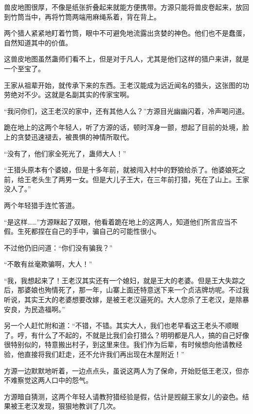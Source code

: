 
\begin{this_body}



兽皮地图很厚，不像是纸张折叠起来就能方便携带。方源只能将兽皮卷起来，放回到竹筒当中，再将竹筒两端用麻绳系着，背在背上。

两个猎人紧紧地盯着竹筒，眼中不可避免地流露出贪婪的神色。他们也不是蠢蛋，自然知道其中的价值。

这兽皮地图虽然蛊师们看不上，但是对于凡人，尤其是他们这样的猎户来讲，就是一个至宝了。

王家从祖辈开始，就传承下来的东西。王老汉能成为远近闻名的猎头，这张图的功劳绝对不少。这就是名副其实的传家宝啊。

“我问你们，这王老汉的家中，还有其他人么？”方源目光幽幽闪着，冷声喝问道。

跪在地上的这两个年轻人，听了方源的话，顿时浑身一颤，想起了目前的处境，脸上的贪婪迅速褪去，被畏惧的神情所取代。

“没有了，他们家全死光了，蛊师大人！”

“王猎头原本有个婆娘，但是十多年前，就被闯入村中的野狼给杀了。他婆娘死之前，给王老头生了两男一女。但是大儿子王大，在三年前打猎，死在了山上。王家没人了。”

两个年轻猎手连忙答道。

“是这样……”方源眯起了双眼，他看着跪在地上的这两人，知道他们所言应当不假。生死都捏在自己的手中，骗自己的可能性很小。

不过他仍旧问道：“你们没有骗我？”

“不敢有丝毫欺骗啊，大人！”

“我，我想起来了！王老汉其实还有一个媳妇，就是王大的老婆。但是王大失踪之后，那婆娘也殉情死了，那一年，山寨上面还特意送下来一个贞洁牌坊呢。不过我听说，其实王大的老婆想要改嫁，是被王老汉逼死的。大人您杀了王老汉，是除暴安良，为民造福啊。”

另一个人赶忙附和道：“不错，不错。其实大人，我们也老早看这王老头不顺眼了。哼，有什么了不起的，不就是比我们会打猎么？明明都是凡人，搞的自己好像很特别似的，特意搬出村子，到这里来住。我们作为后辈，有时候想向他请教经验，他直接将我们赶走，还不允许我们再出现在木屋附近！”

方源一边默默地听着，一边点点头，虽说这两人为了保命，开始贬低王老汉，但亦不难察觉这两人口中的怨气。

方源暗自猜测，这两个年轻人请教狩猎经验是假，估计是觊觎王家女儿的姿色。结果被王老汉发现，狠狠地教训了几次。


\end{this_body}
